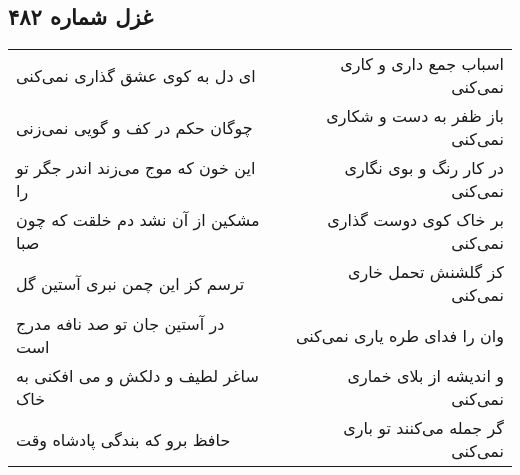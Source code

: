 \begin{center}
\section*{غزل شماره ۴۸۲}
\label{sec:sh482}
\begin{longtable}{l p{0.5cm} r}
ای دل به کوی عشق گذاری نمی‌کنی
&&
اسباب جمع داری و کاری نمی‌کنی
\\
چوگان حکم در کف و گویی نمی‌زنی
&&
باز ظفر به دست و شکاری نمی‌کنی
\\
این خون که موج می‌زند اندر جگر تو را
&&
در کار رنگ و بوی نگاری نمی‌کنی
\\
مشکین از آن نشد دم خلقت که چون صبا
&&
بر خاک کوی دوست گذاری نمی‌کنی
\\
ترسم کز این چمن نبری آستین گل
&&
کز گلشنش تحمل خاری نمی‌کنی
\\
در آستین جان تو صد نافه مدرج است
&&
وان را فدای طره یاری نمی‌کنی
\\
ساغر لطیف و دلکش و می افکنی به خاک
&&
و اندیشه از بلای خماری نمی‌کنی
\\
حافظ برو که بندگی پادشاه وقت
&&
گر جمله می‌کنند تو باری نمی‌کنی
\\
\end{longtable}
\end{center}
